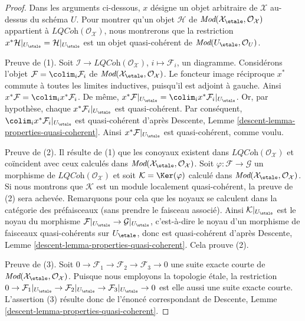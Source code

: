 \begin{proof}
Dans les arguments ci-dessous, $x$ désigne un objet arbitraire de $\mathcal{X}$
au-dessus du schéma $U$. Pour montrer qu'un objet $\mathcal{H}$
de $\textit{Mod}(\mathcal{X}_\etale, \mathcal{O}_\mathcal{X})$ appartient
à $\textit{LQCoh}(\mathcal{O}_\mathcal{X})$, nous montrerons que la
restriction $x^*\mathcal{H}|_{U_\etale} = \mathcal{H}|_{U_\etale}$
est un objet quasi-cohérent de $\textit{Mod}(U_\etale, \mathcal{O}_U)$.

\medskip\noindent
Preuve de (1). Soit $\mathcal{I} \to \textit{LQCoh}(\mathcal{O}_\mathcal{X})$,
$i \mapsto \mathcal{F}_i$, un diagramme.
Considérons l'objet $\mathcal{F} = \colim_i \mathcal{F}_i$ de
$\textit{Mod}(\mathcal{X}_\etale, \mathcal{O}_\mathcal{X})$.
Le foncteur image réciproque $x^*$ commute à toutes les limites inductives,
puisqu'il est adjoint à gauche. Ainsi
$x^*\mathcal{F} = \colim_i x^*\mathcal{F}_i$. De même,
$x^*\mathcal{F}|_{U_\etale} =
\colim_i x^*\mathcal{F}_i|_{U_\etale}$.
Or, par hypothèse, chaque $x^*\mathcal{F}_i|_{U_\etale}$
est quasi-cohérent. Par conséquent, $\colim_i x^*\mathcal{F}_i|_{U_\etale}$
est quasi-cohérent d'après
Descente, Lemme \ref{descent-lemma-properties-quasi-coherent}.
Ainsi $x^*\mathcal{F}|_{U_\etale}$ est quasi-cohérent, comme voulu.

\medskip\noindent
Preuve de (2). Il résulte de (1) que les conoyaux existent dans
$\textit{LQCoh}(\mathcal{O}_\mathcal{X})$ et coïncident avec ceux calculés
dans $\textit{Mod}(\mathcal{X}_\etale, \mathcal{O}_\mathcal{X})$.
Soit $\varphi : \mathcal{F} \to \mathcal{G}$ un morphisme de
$\textit{LQCoh}(\mathcal{O}_\mathcal{X})$ et soit
$\mathcal{K} = \Ker(\varphi)$ calculé dans
$\textit{Mod}(\mathcal{X}_\etale, \mathcal{O}_\mathcal{X})$.
Si nous montrons que $\mathcal{K}$ est un module localement quasi-cohérent,
la preuve de (2) sera achevée. Remarquons pour cela que les noyaux
se calculent dans la catégorie des préfaisceaux (sans prendre le faisceau associé).
Ainsi $\mathcal{K}|_{U_\etale}$ est le noyau du morphisme
$\mathcal{F}|_{U_\etale} \to \mathcal{G}|_{U_\etale}$,
c'est-à-dire le noyau d'un morphisme de faisceaux quasi-cohérents sur $U_\etale$,
donc est quasi-cohérent d'après
Descente, Lemme \ref{descent-lemma-properties-quasi-coherent}.
Cela prouve (2).

\medskip\noindent
Preuve de (3). Soit
$0 \to \mathcal{F}_1 \to \mathcal{F}_2 \to \mathcal{F}_3 \to 0$
une suite exacte courte de
$\textit{Mod}(\mathcal{X}_\etale, \mathcal{O}_\mathcal{X})$.
Puisque nous employons la topologie \'etale, la restriction
$0 \to \mathcal{F}_1|_{U_\etale} \to
\mathcal{F}_2|_{U_\etale} \to \mathcal{F}_3|_{U_\etale} \to 0$
est elle aussi une suite exacte courte. L'assertion (3) résulte donc de l'énoncé
correspondant de
Descente, Lemme \ref{descent-lemma-properties-quasi-coherent}.


\end{proof}
